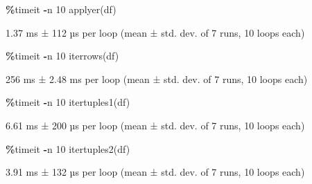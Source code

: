 \documentclass[
]{book}
\newenvironment{Shaded}{\begin{snugshade}}{\end{snugshade}}
\newcommand{\DecValTok}[1]{\textcolor[rgb]{0.00,0.00,0.81}{#1}}
\newcommand{\NormalTok}[1]{#1}
\newcommand{\OperatorTok}[1]{\textcolor[rgb]{0.81,0.36,0.00}{\textbf{#1}}}
\begin{document}
\begin{Shaded}
\begin{Highlighting}[]
\OperatorTok{\%}\NormalTok{timeit }\OperatorTok{{-}}\NormalTok{n }\DecValTok{10}\NormalTok{ applyer(df)}
\end{Highlighting}
\end{Shaded}

\begin{Shaded}
\begin{Highlighting}[]
\NormalTok{1.37 ms ± 112 µs per loop (mean ± std. dev. of 7 runs, 10 loops each)}
\end{Highlighting}
\end{Shaded}

\begin{Shaded}
\begin{Highlighting}[]
\OperatorTok{\%}\NormalTok{timeit }\OperatorTok{{-}}\NormalTok{n }\DecValTok{10}\NormalTok{ iterrows(df)}
\end{Highlighting}
\end{Shaded}

\begin{Shaded}
\begin{Highlighting}[]
\NormalTok{256 ms ± 2.48 ms per loop (mean ± std. dev. of 7 runs, 10 loops each)}
\end{Highlighting}
\end{Shaded}

\begin{Shaded}
\begin{Highlighting}[]
\OperatorTok{\%}\NormalTok{timeit }\OperatorTok{{-}}\NormalTok{n }\DecValTok{10}\NormalTok{ itertuples1(df)}
\end{Highlighting}
\end{Shaded}

\begin{Shaded}
\begin{Highlighting}[]
\NormalTok{6.61 ms ± 200 µs per loop (mean ± std. dev. of 7 runs, 10 loops each)}
\end{Highlighting}
\end{Shaded}

\begin{Shaded}
\begin{Highlighting}[]
\OperatorTok{\%}\NormalTok{timeit }\OperatorTok{{-}}\NormalTok{n }\DecValTok{10}\NormalTok{ itertuples2(df)}
\end{Highlighting}
\end{Shaded}

\begin{Shaded}
\begin{Highlighting}[]
\NormalTok{3.91 ms ± 132 µs per loop (mean ± std. dev. of 7 runs, 10 loops each)}
\end{Highlighting}
\end{Shaded}
\end{document}

